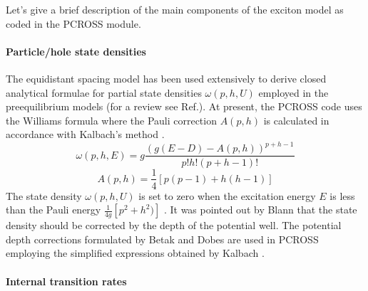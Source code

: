 Let's give a brief description of the main components of the exciton model
as coded in the PCROSS module.

\paragraph{Particle/hole state densities}

The equidistant spacing model has been used extensively to derive closed
analytical formulae for partial state densities $\omega (p,h,U)$ employed in
the preequilibrium models (for a review see Ref.\cite{ripl2}). At present,
the PCROSS code uses the Williams formula \cite{wi71} where the Pauli
correction $A(p,h)$ is calculated in accordance with Kalbach's method \cite%
{ka83}.
\begin{equation}
\omega (p,h,E)=g\frac{\left( g(E-D)-A(p,h)\right) ^{p+h-1}}{p!h!(p+h-1)!}
\end{equation}%
\begin{equation*}
A(p,h)=\frac{1}{4}\left[ p(p-1)+h(h-1)\right]
\end{equation*}%
The state density $\omega (p,h,U)$ is set to zero when the excitation energy
$E$ is less than the Pauli energy $\frac{1}{4g}\left[ p^{2}+h^{2})\right] $
\cite{bacape89}. It was pointed out by Blann \cite{bl72} that the state
density should be corrected by the depth of the potential well. The
potential depth corrections formulated by Betak and Dobes \cite{bedo76} are
used in PCROSS employing the simplified expressions obtained by Kalbach \cite%
{ka77,ka83}.

\paragraph{Internal transition rates}

